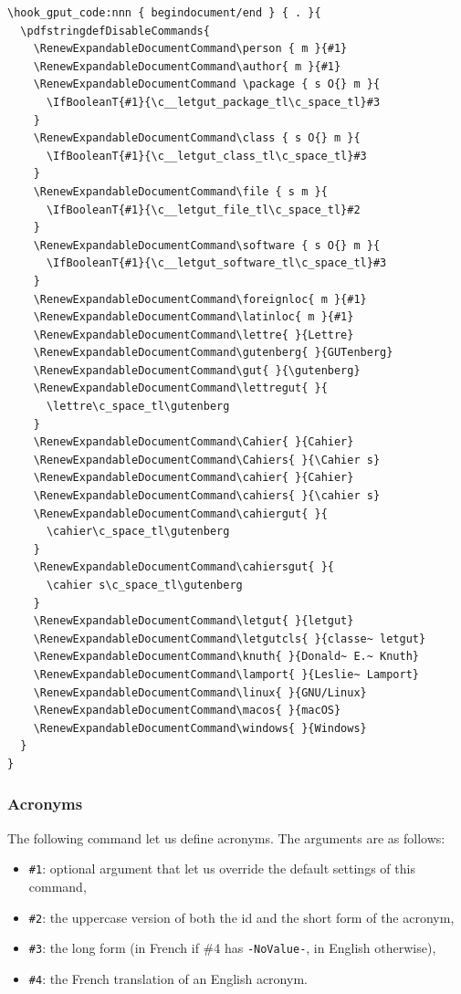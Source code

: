 \documentclass{letgut}
\begin{document}
\begin{lstlisting}
\hook_gput_code:nnn { begindocument/end } { . }{
  \pdfstringdefDisableCommands{
    \RenewExpandableDocumentCommand\person { m }{#1}
    \RenewExpandableDocumentCommand\author{ m }{#1}
    \RenewExpandableDocumentCommand \package { s O{} m }{
      \IfBooleanT{#1}{\c__letgut_package_tl\c_space_tl}#3
    }
    \RenewExpandableDocumentCommand\class { s O{} m }{
      \IfBooleanT{#1}{\c__letgut_class_tl\c_space_tl}#3
    }
    \RenewExpandableDocumentCommand\file { s m }{
      \IfBooleanT{#1}{\c__letgut_file_tl\c_space_tl}#2
    }
    \RenewExpandableDocumentCommand\software { s O{} m }{
      \IfBooleanT{#1}{\c__letgut_software_tl\c_space_tl}#3
    }
    \RenewExpandableDocumentCommand\foreignloc{ m }{#1}
    \RenewExpandableDocumentCommand\latinloc{ m }{#1}
    \RenewExpandableDocumentCommand\lettre{ }{Lettre}
    \RenewExpandableDocumentCommand\gutenberg{ }{GUTenberg}
    \RenewExpandableDocumentCommand\gut{ }{\gutenberg}
    \RenewExpandableDocumentCommand\lettregut{ }{
      \lettre\c_space_tl\gutenberg
    }
    \RenewExpandableDocumentCommand\Cahier{ }{Cahier}
    \RenewExpandableDocumentCommand\Cahiers{ }{\Cahier s}
    \RenewExpandableDocumentCommand\cahier{ }{Cahier}
    \RenewExpandableDocumentCommand\cahiers{ }{\cahier s}
    \RenewExpandableDocumentCommand\cahiergut{ }{
      \cahier\c_space_tl\gutenberg
    }
    \RenewExpandableDocumentCommand\cahiersgut{ }{
      \cahier s\c_space_tl\gutenberg
    }
    \RenewExpandableDocumentCommand\letgut{ }{letgut}
    \RenewExpandableDocumentCommand\letgutcls{ }{classe~ letgut}
    \RenewExpandableDocumentCommand\knuth{ }{Donald~ E.~ Knuth}
    \RenewExpandableDocumentCommand\lamport{ }{Leslie~ Lamport}
    \RenewExpandableDocumentCommand\linux{ }{GNU/Linux}
    \RenewExpandableDocumentCommand\macos{ }{macOS}
    \RenewExpandableDocumentCommand\windows{ }{Windows}
  }
}
\end{lstlisting}
\subsubsection{Acronyms}
\label{ImplementationDocumentcommandsAcronyms-93yg55h0jlj0}
The following command let us define acronyms. The arguments are as follows:
\begin{itemize}
\item \lstinline+#1+: optional argument that let us override the default settings of this
command,
\item \lstinline+#2+: the uppercase version of both the id and the short form of the acronym,
\item \lstinline+#3+: the long form (in French if \#4 has \lstinline+-NoValue-+, in English otherwise),
\item \lstinline+#4+: the French translation of an English acronym.
\end{itemize}
\end{document}
